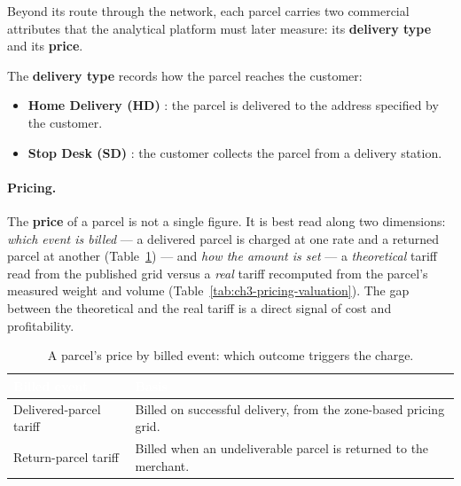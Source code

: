 Beyond its route through the network, each parcel carries two commercial attributes that the
analytical platform must later measure: its \textbf{delivery type} and its \textbf{price}.

The \textbf{delivery type} records how the parcel reaches the customer:

\begin{itemize}[noitemsep]
    \item \textbf{Home Delivery (HD)} : the parcel is delivered to the address specified by the
          customer.
    \item \textbf{Stop Desk (SD)} : the customer collects the parcel from a delivery station.
\end{itemize}

\paragraph{Pricing.}
The \textbf{price} of a parcel is not a single figure. It is best read along two dimensions: \emph{which
event is billed} --- a delivered parcel is charged at one rate and a returned parcel at another
(Table~\ref{tab:ch3-pricing-event}) --- and \emph{how the amount is set} --- a \emph{theoretical} tariff
read from the published grid versus a \emph{real} tariff recomputed from the parcel's measured weight and
volume (Table~\ref{tab:ch3-pricing-valuation}). The gap between the theoretical and the real tariff is a
direct signal of cost and profitability.

\begin{table}[H]
\centering
\caption{A parcel's price by billed event: which outcome triggers the charge.}
\label{tab:ch3-pricing-event}
\renewcommand{\arraystretch}{1.35}
\begin{tabularx}{\linewidth}{|>{\raggedright\arraybackslash}p{3.7cm}|>{\raggedright\arraybackslash}X|}
\hline
\rowcolor{tblheader}
\textcolor{white}{\textbf{Billed event}} & \textcolor{white}{\textbf{Basis}} \\
\hline
Delivered-parcel tariff & Billed on successful delivery, from the zone-based pricing grid. \\
Return-parcel tariff & Billed when an undeliverable parcel is returned to the merchant. \\
\hline
\end{tabularx}
\end{table}

